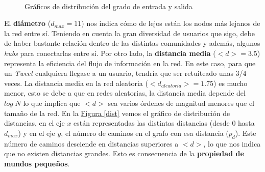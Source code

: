 \documentclass[10pt,a4paper,spanish]{article}
\numberwithin{equation}{section} %
\numberwithin{figure}{section} %
\numberwithin{table}{section} %
\begin{document}
\begin{figure}[!h]
    \centering
    \mbox{
    }
    \caption{Gráficos de distribución del grado de entrada y salida}
    \label{degree}
\end{figure}

El \textbf{diámetro} ($d_{max} = 11$) nos indica cómo de lejos están los nodos más lejanos de la red entre sí. Teniendo en cuenta la gran diversidad de usuarios que sigo, debe de haber bastante relación dentro de las distintas comunidades y además, algunos \textit{hubs} para conectarlas entre sí. Por otro lado, la \textbf{distancia media} ($<d> = 3.5$) representa la eficiencia del flujo de información en la red. En este caso, para que un \textit{Tweet} cualquiera llegase a un usuario, tendría que ser retuiteado unas 3/4 veces. La distancia media en la red aleatoria ($<d_{aleatoria}> = 1.75$) es mucho menor, esto se debe a que en redes aleatorias, la distancia media depende del $log \; N$ lo que implica que $<d>$ sea varios órdenes de magnitud menores que el tamaño de la red. En la \hyperref[dist]{Figura \ref*{dist}} vemos el gráfico de distribución de distancias, en el eje $x$ están representadas las distintas distancias (desde 0 hasta $d_{max}$) y en el eje $y$, el número de caminos en el grafo con esa distancia ($p_d$). Este número de caminos desciende en distancias superiores a $<d>$, lo que nos indica que no existen distancias grandes. Esto es consecuencia de la \textbf{propiedad de mundos pequeños}.
\end{document}
